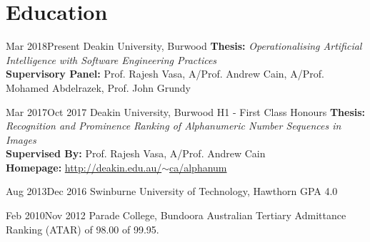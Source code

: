\section{Education}

{Mar 2018}{Present}
{Deakin University, Burwood}
{}
{
  \vspace{-2em}
  \textbf{Thesis:} \textit{Operationalising Artificial Intelligence with Software Engineering Practices}\\
  \textbf{Supervisory Panel:} Prof. Rajesh Vasa, A/Prof. Andrew Cain, A/Prof. Mohamed Abdelrazek, Prof. John Grundy
}

{Mar 2017}{Oct 2017}
{Deakin University, Burwood}
{H1 - First Class Honours}
{
  \textbf{Thesis:} \textit{Recognition and Prominence Ranking of Alphanumeric Number Sequences in Images}\\
  \textbf{Supervised By:} Prof. Rajesh Vasa, A/Prof. Andrew Cain\\
  \textbf{Homepage:} \href{deakin.edu.au/~ca/alphanum}{http://deakin.edu.au/$\sim$ca/alphanum}
}

{Aug 2013}{Dec 2016}
{Swinburne University of Technology, Hawthorn}
{GPA 4.0}
{}

{Feb 2010}{Nov 2012}
{Parade College, Bundoora}
{Australian Tertiary Admittance Ranking (ATAR) of 98.00 of 99.95.}
{}